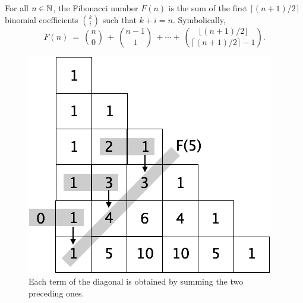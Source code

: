 \begin{prop}
\label{thm:FibNo+BinomCoeff}
For all $n \in \mathbb{N}$, the Fibonacci number $F(n)$ is the sum of the first $\lceil (n+1)/2 \rceil$ binomial coefficients $\displaystyle {k  \choose i}$ such that $k+i = n$.  Symbolically,
\begin{equation}
\label{eq:FibNo+BinomCoeff}
F(n) \ = \ {n \choose 0} \ + \ {{n-1} \choose 1} \ + \cdots + \ 
{{\lfloor (n+1)/2 \rfloor} \choose {\lceil (n+1)/2 \rceil -1}}.
\end{equation}
\end{prop}

\begin{figure}[htb]
\begin{center}
        \includegraphics[scale=0.3]{FiguresMaths//FiboPascal2}
\caption{Each term of the diagonal is obtained by summing the two preceding ones.}
        \label{fig:FiboPascalExplanation}
\end{center}
\end{figure}

